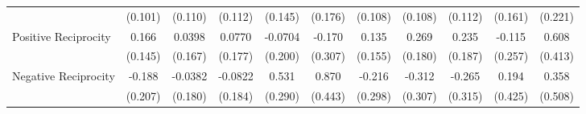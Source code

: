 {\begin{tabular}{l*{10}{c}}
            &     (0.101)         &     (0.110)         &     (0.112)         &     (0.145)         &     (0.176)         &     (0.108)         &     (0.108)         &     (0.112)         &     (0.161)         &     (0.221)         \\
\addlinespace
Positive Reciprocity&       0.166         &      0.0398         &      0.0770         &     -0.0704         &      -0.170         &       0.135         &       0.269         &       0.235         &      -0.115         &       0.608         \\
            &     (0.145)         &     (0.167)         &     (0.177)         &     (0.200)         &     (0.307)         &     (0.155)         &     (0.180)         &     (0.187)         &     (0.257)         &     (0.413)         \\
\addlinespace
Negative Reciprocity&      -0.188         &     -0.0382         &     -0.0822         &       0.531         &       0.870\sym{*}  &      -0.216         &      -0.312         &      -0.265         &       0.194         &       0.358         \\
            &     (0.207)         &     (0.180)         &     (0.184)         &     (0.290)         &     (0.443)         &     (0.298)         &     (0.307)         &     (0.315)         &     (0.425)         &     (0.508)         \\
\bottomrule
\end{tabular}
}
